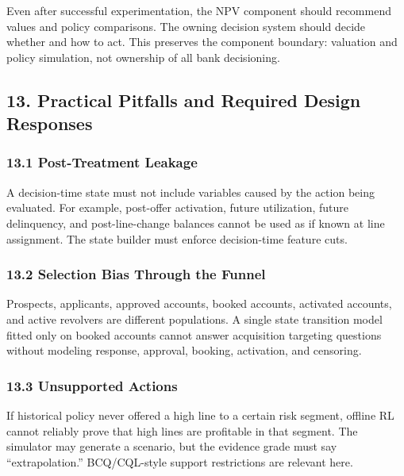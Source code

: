 \documentclass[
]{article}
\begin{document}
Even after successful experimentation, the NPV component should
recommend values and policy comparisons. The owning decision system
should decide whether and how to act. This preserves the component
boundary: valuation and policy simulation, not ownership of all bank
decisioning.

\hypertarget{practical-pitfalls-and-required-design-responses}{%
\subsection{13. Practical Pitfalls and Required Design
Responses}\label{practical-pitfalls-and-required-design-responses}}

\hypertarget{post-treatment-leakage}{%
\subsubsection{13.1 Post-Treatment
Leakage}\label{post-treatment-leakage}}

A decision-time state must not include variables caused by the action
being evaluated. For example, post-offer activation, future utilization,
future delinquency, and post-line-change balances cannot be used as if
known at line assignment. The state builder must enforce decision-time
feature cuts.

\hypertarget{selection-bias-through-the-funnel}{%
\subsubsection{13.2 Selection Bias Through the
Funnel}\label{selection-bias-through-the-funnel}}

Prospects, applicants, approved accounts, booked accounts, activated
accounts, and active revolvers are different populations. A single state
transition model fitted only on booked accounts cannot answer
acquisition targeting questions without modeling response, approval,
booking, activation, and censoring.

\hypertarget{unsupported-actions}{%
\subsubsection{13.3 Unsupported Actions}\label{unsupported-actions}}

If historical policy never offered a high line to a certain risk
segment, offline RL cannot reliably prove that high lines are profitable
in that segment. The simulator may generate a scenario, but the evidence
grade must say ``extrapolation.'' BCQ/CQL-style support restrictions are
relevant here.
\end{document}
